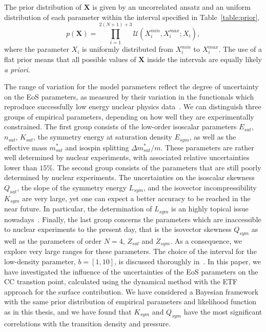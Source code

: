 The prior distribution of $\bm{X}$ is given by an uncorrelated ansatz and an
uniform distribution of each parameter within the interval specified in
Table~\ref{table:prior},
%
\begin{equation}
  p(\bm{X}) = \prod_{i=1}^{2(N+1)+3} \mathcal{U}(X_i^{min}, X_i^{max};X_i),
\end{equation}
%
where the parameter $X_i$ is uniformly distributed from $X_i^{min}$ to 
$X_i^{max}$. The use of a flat prior means that all possible values of 
$\bm{X}$ inside the intervals are equally likely \textit{a priori}.

The range of variation for the model parameters reflect the degree of 
uncertainty on the EoS parameters, as measured by their variation in the 
functionals which reproduce successfully low energy nuclear physics
data~\cite{Margueron2018a}. We can distinguish three groups of empirical  
parameters, depending on how well they are experimentally constrained. The 
first group consists of the low-order isoscalar parameters $E_{sat}$, 
$n_{sat}$, $K_{sat}$, the symmetry energy at saturation density $E_{sym}$, as 
well as the effective mass $m_{sat}^*$ and isospin splitting 
$\Delta m_{sat}^*/m$. These parameters are rather well determined by nuclear 
experiments, with associated relative uncertainties lower than $15\%$. The 
second group consists of the parameters that are still poorly determined by 
nuclear experiments. The uncertainties on the isoscalar skewness $Q_{sat}$, the 
slope of the symmetry energy $L_{sym}$, and the isovector incompressibility 
$K_{sym}$ are very large, yet one can expect a better accuracy to be 
reached in the near future. In particular, the determination of $L_{sym}$ is 
an highly topical issue nowadays~\cite{Li2014}. Finally, the last group 
concerns the parameters which are inaccessible to nuclear experiments to the 
present day, that is the isovector skewness $Q_{sym}$ as well as the parameters 
of order $N=4$, $Z_{sat}$ and $Z_{sym}$. As a consequence, we explore very 
large ranges for these parameters. 
The choice of the interval for the low-density parameter, $b = [1,10]$, is 
discussed thoroughly in~\cite{Antic2019}. {In this paper, we have 
  investigated the influence of the uncertainties of the EoS parameters on the
CC transtion point, calculated using the dynamical method with the ETF
approach for the surface contribution. We have considered a Bayesian framework
with the same prior distribution of empirical parameters and likelihood 
function as in this thesis, and we have found that $K_{sym}$ and $Q_{sym}$ have 
the most significant correlations with the transition density and pressure.}

